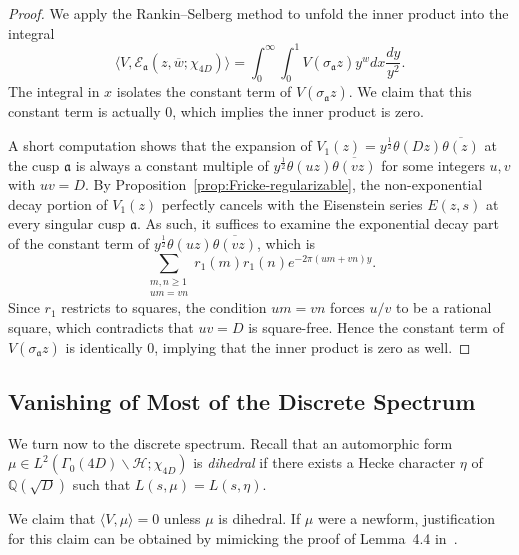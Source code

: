\documentclass[11pt,reqno,oneside]{amsart}
\theoremstyle{plain}
\theoremstyle{definition}
\newcommand{\Q}{\mathbb{Q}}
\newcommand{\calH}{\mathcal{H}}
\newcommand{\chid}{\chi_{4D}}
\begin{document}
\begin{proof}
  We apply the Rankin--Selberg method to  %
  unfold the inner product into the integral
  \[
    \langle
    V,
    \mathcal{E}_\mathfrak{a}(z,\overline{w}; \chid)
    \rangle
    =
    \int_0^\infty \int_0^1
    V(\sigma_\mathfrak{a}z) y^w dx \frac{dy}{y^2}.
  \]
  The integral in $x$ isolates the constant term of $V(\sigma_{\mathfrak{a}}z)$.
  We claim that this constant term is actually $0$, which implies the inner
  product is zero.

  A short computation shows that the expansion of
  $V_1(z) = y^{\frac{1}{2}} \theta(Dz) \overline{\theta(z)}$ at the cusp
  $\mathfrak{a}$ is always a constant multiple of $y^{\frac{1}{2}} \theta(uz)
    \overline{\theta(vz)}$ for some integers $u,v$ with $uv = D$.
  By Proposition~\ref{prop:Fricke-regularizable}, the
  non-exponential decay portion of $V_1(z)$ perfectly cancels with the
  Eisenstein series $E(z, s)$ at every singular cusp $\mathfrak{a}$.
  As such, it suffices to examine the exponential decay part of the constant
  term of $y^{\frac{1}{2}}
    \theta(uz) \overline{\theta(vz)}$, which is
  \[
    \sum_{\substack{m,n \geq 1 \\ um = vn}} r_1(m) r_1(n) e^{-2\pi (um + vn)y}.
  \]
  Since $r_1$ restricts to squares, the condition $um=vn$ forces $u/v$ to be a
  rational square, which contradicts that $uv=D$ is square-free.
  Hence the constant term of $V(\sigma_\mathfrak{a} z)$ is identically $0$,
  implying that the inner product is zero as well.
\end{proof}


\subsection{Vanishing of Most of the Discrete Spectrum}\label{ssec:disc}

We turn now to the discrete spectrum.
Recall that an automorphic form $\mu \in L^2(\Gamma_0(4D) \backslash \calH;
  \chid)$ is \emph{dihedral} if there exists a Hecke character $\eta$ of
$\Q(\sqrt{D})$ such that $L(s, \mu) = L(s, \eta)$.

We claim that $\langle V, \mu \rangle = 0$ unless $\mu$ is dihedral.
If $\mu$ were a newform, justification for this claim can be obtained by
mimicking the proof of Lemma~4.4 in~\cite{hkldw_3aps}.
\end{document}
